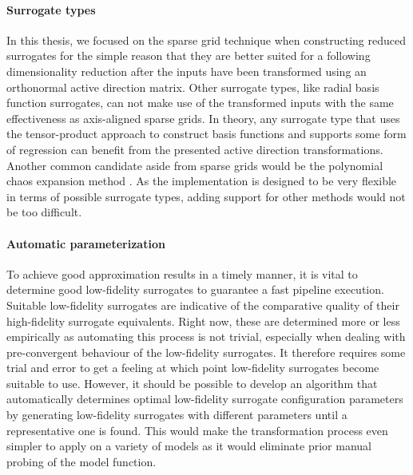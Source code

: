 \documentclass[
  a4paper,  %
  twoside,  %
  bibliography=totoc,
  headsepline,
  cleardoublepage=empty,
  parskip=half,
  draft=false
]{scrbook}
\begin{document}
\paragraph{Surrogate types}
In this thesis, we focused on the sparse grid technique when constructing reduced surrogates for the simple reason that they are better suited for a following dimensionality reduction after the inputs have been transformed using an orthonormal active direction matrix.
Other surrogate types, like radial basis function surrogates, can not make use of the transformed inputs with the same effectiveness as axis-aligned sparse grids.
In theory, any surrogate type that uses the tensor-product approach to construct basis functions and supports some form of regression can benefit from the presented active direction transformations.
Another common candidate aside from sparse grids would be the polynomial chaos expansion method \cite{Crestaux2009}.
As the implementation is designed to be very flexible in terms of possible surrogate types, adding support for other methods would not be too difficult.

\paragraph{Automatic parameterization}
To achieve good approximation results in a timely manner, it is vital to determine good low-fidelity surrogates to guarantee a fast pipeline execution.
Suitable low-fidelity surrogates are indicative of the comparative quality of their high-fidelity surrogate equivalents.
Right now, these are determined more or less empirically as automating this process is not trivial, especially when dealing with pre-convergent behaviour of the low-fidelity surrogates.
It therefore requires some trial and error to get a feeling at which point low-fidelity surrogates become suitable to use.
However, it should be possible to develop an algorithm that automatically determines optimal low-fidelity surrogate configuration parameters by generating low-fidelity surrogates with different parameters until a representative one is found.
This would make the transformation process even simpler to apply on a variety of models as it would eliminate prior manual probing of the model function.

\newpage
\printbibliography


\pagestyle{empty}
\renewcommand*{\chapterpagestyle}{empty}
\Versicherung
\end{document}
